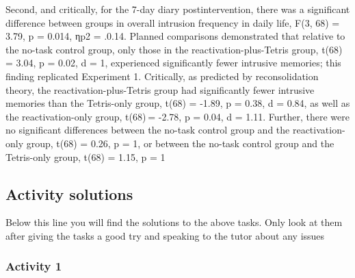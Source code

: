 \documentclass[]{book}
\newenvironment{Shaded}{\begin{snugshade}}{\end{snugshade}}
\newcommand{\DataTypeTok}[1]{\textcolor[rgb]{0.13,0.29,0.53}{#1}}
\newcommand{\KeywordTok}[1]{\textcolor[rgb]{0.13,0.29,0.53}{\textbf{#1}}}
\newcommand{\NormalTok}[1]{#1}
\newcommand{\OperatorTok}[1]{\textcolor[rgb]{0.81,0.36,0.00}{\textbf{#1}}}
\newcommand{\StringTok}[1]{\textcolor[rgb]{0.31,0.60,0.02}{#1}}
\begin{document}
\begin{Shaded}
\begin{Highlighting}[]
the reactivation}\OperatorTok{-}\NormalTok{only group, }\KeywordTok{t}\NormalTok{(}\StringTok{`}\DataTypeTok{r mod_contrasts$df[3]}\StringTok{`}\NormalTok{) =}\StringTok{ `}\DataTypeTok{r mod_contrasts$statistic[3] %
\end{Highlighting}
\end{Shaded}

Second, and critically, for the 7-day diary postintervention, there was a significant difference between groups in overall intrusion frequency in daily life, F(3, 68) = 3.79, p = 0.014, ηp2 = .0.14. Planned comparisons demonstrated that relative to the no-task control group, only those in the reactivation-plus-Tetris group, t(68) = 3.04, p = 0.02, d = 1, experienced significantly fewer intrusive memories; this finding replicated Experiment 1. Critically, as predicted by reconsolidation theory, the reactivation-plus-Tetris group had significantly fewer intrusive memories than the Tetris-only group, t(68) = -1.89, p = 0.38, d = 0.84, as well as the reactivation-only group, t(68) = -2.78, p = 0.04, d = 1.11. Further, there were no significant differences between the no-task control group and the reactivation-only group, t(68) = 0.26, p = 1, or between the no-task control group and the Tetris-only group, t(68) = 1.15, p = 1

\hypertarget{activity-solutions-7}{%
\subsection{Activity solutions}\label{activity-solutions-7}}

Below this line you will find the solutions to the above tasks. Only look at them after giving the tasks a good try and speaking to the tutor about any issues

\hypertarget{activity-1-5}{%
\subsubsection{Activity 1}\label{activity-1-5}}
\end{document}
